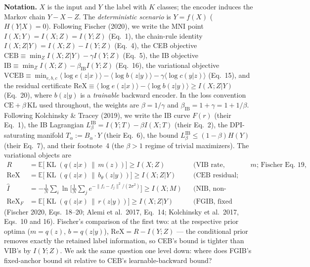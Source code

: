 \textbf{Notation.}
$X$ is the input and $Y$ the label with $K$ classes; the encoder induces the Markov chain
$Y - X - Z$. The \emph{deterministic scenario} is $Y = f(X)$ ($H(Y|X) = 0$). Following
Fischer (2020), we write the MNI point $I(X;Y) = I(X;Z) = I(Y;Z)$ (Eq.~1), the
chain-rule identity $I(X;Z|Y) = I(X;Z) - I(Y;Z)$ (Eq.~4), the CEB objective
$\mathrm{CEB} \equiv \min_Z I(X;Z|Y) - \gamma I(Y;Z)$ (Eq.~5), the IB objective
$\mathrm{IB} \equiv \min_Z I(X;Z) - \beta_{\mathrm{IB}} I(Y;Z)$ (Eq.~16), the
variational objective
$\mathrm{VCEB} \equiv \min_{e,b,c} \langle \log e(z|x)\rangle - \langle \log b(z|y)\rangle
- \gamma \langle \log c(y|z)\rangle$ (Eq.~15), and the residual certificate
$\mathrm{ReX} \equiv \langle \log e(z|x)\rangle - \langle \log b(z|y)\rangle
\ge I(X;Z|Y)$ (Eq.~20), where $b(z|y)$ is a \emph{trainable} backward encoder. In the
loss convention $\mathrm{CE} + \beta\,\mathrm{KL}$ used throughout, the weights are
$\beta = 1/\gamma$ and $\beta_{\mathrm{IB}} = 1 + \gamma = 1 + 1/\beta$. Following
Kolchinsky \& Tracey (2019), we write the IB curve $F(r)$ (their Eq.~1), the IB
Lagrangian $L^{\mathrm{IB}}_\beta = I(Y;T) - \beta I(X;T)$ (their Eq.~2), the
DPI-saturating manifold $T_\alpha := B_\alpha \cdot Y$ (their Eq.~6), the bound
$L^{\mathrm{IB}}_\beta \le (1-\beta)H(Y)$ (their Eq.~7), and their footnote~4 (the
$\beta > 1$ regime of trivial maximizers). The variational objects are
\begin{align*}
R &= \mathbb{E}\big[\operatorname{KL}(q(z|x)\,\|\,m(z))\big] \ge I(X;Z)
&&\text{(VIB rate, marginal prior $m$; Fischer Eq.~19, Alemi et al.\ Eq.~14)} \\
\mathrm{ReX} &= \mathbb{E}\big[\operatorname{KL}(q(z|x)\,\|\,b_\theta(z|y))\big]
\ge I(X;Z|Y)
&&\text{(CEB residual; Fischer Eq.~20)} \\
\widehat I &= -\frac{1}{N}\sum_i \ln\Big[\frac{1}{N}\sum_j
e^{-\|f_i-f_j\|^2/(2\sigma^2)}\Big] \ge I(X;M)
&&\text{(NIB, non-parametric; Eq.~16, the homoscedastic case of Eq.~10)} \\
\mathrm{ReX}_F &= \mathbb{E}\big[\operatorname{KL}(q(z|x)\,\|\,r(z|y))\big]
\ge I(X;Z|Y)
&&\text{(FGIB, fixed anchor)}
\end{align*}
(Fischer 2020, Eqs.~18--20; Alemi et al.\ 2017, Eq.~14; Kolchinsky et al.\ 2017,
Eqs.~10 and 16). Fischer's comparison of the first two: at the respective prior optima
($m = q(z)$, $b = q(z|y)$), $\mathrm{ReX} = R - I(Y;Z)$ --- the conditional prior removes
exactly the retained label information, so CEB's bound is tighter than VIB's by
$I(Y;Z)$. We ask the same question one level down: where does FGIB's fixed-anchor bound
sit relative to CEB's learnable-backward bound?

